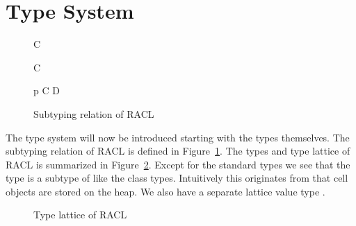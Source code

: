 \section{Type System}
\label{sec:type_system}

\begin{figure}
  \begin{multicols}{2}

    {\tau \stof \RaclTop}

    \RuleSpace

    {\RaclBot \stof \tau}

    \RuleSpace

    {\CellType \stof \AnyRefType}

    \RuleSpace

    {C \stof \AnyRefType}

    \RuleSpace

    {\NullType \stof \CellType}
    
    \RuleSpace

    {\NullType \stof C}
  \end{multicols}

  \RuleSpace

  {p \vdash {}}
  {C \stof D}

  \caption{Subtyping relation of RACL}
  \label{fig:def_stof}
\end{figure}

The type system will now be introduced starting with the types themselves.
The subtyping relation of RACL is defined in Figure~\ref{fig:def_stof}.  The
types and type lattice of RACL is summarized in Figure~\ref{fig:racl_typelat}.
Except for the standard types we see that the \CellType{} type is a subtype of
\AnyRefType{} like the class types. Intuitively this originates from that cell
objects are stored on the heap. We also have a separate lattice value type
\LatType{}.

\begin{figure}[]
  \centering
  \caption{Type lattice of RACL}
  \label{fig:racl_typelat}
\end{figure}

